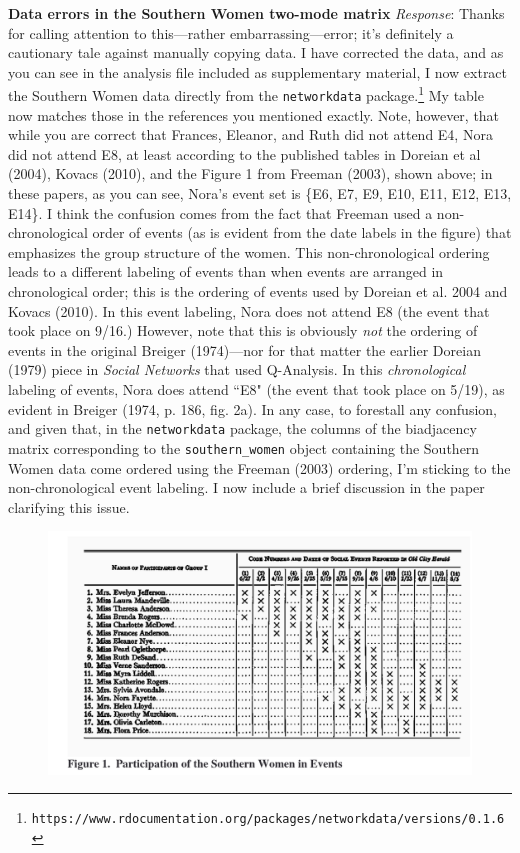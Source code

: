 \documentclass{article}
\begin{document}
\noindent\textbf{Data errors in the Southern Women two-mode matrix}\newline
\textit{Response}: Thanks for calling attention to this---rather embarrassing---error; it's definitely a cautionary tale against manually copying data. I have corrected the data, and as you can see in the analysis file included as supplementary material, I now extract the Southern Women data directly from the \texttt{networkdata} package.\footnote{\texttt{https://www.rdocumentation.org/packages/networkdata/versions/0.1.6}} My table now matches those in the references you mentioned exactly. Note, however, that while you are correct that Frances, Eleanor, and Ruth did not attend E4, Nora did not attend E8, at least according to the published tables in Doreian et al (2004), Kovacs (2010), and the Figure 1 from Freeman (2003), shown above; in these papers, as you can see, Nora's event set is \{E6, E7, E9, E10, E11, E12, E13, E14\}. I think the confusion comes from the fact that Freeman used a non-chronological order of events (as is evident from the date labels in the figure) that emphasizes the group structure of the women. This non-chronological ordering leads to a different labeling of events than when events are arranged in chronological order; this is the ordering of events used by Doreian et al. 2004 and Kovacs (2010). In this event labeling, Nora does not attend E8 (the event that took place on 9/16.) However, note that this is obviously \textit{not} the ordering of events in the original Breiger (1974)---nor for that matter the earlier Doreian (1979) piece in \textit{Social Networks} that used Q-Analysis. In this \textit{chronological} labeling of events, Nora does attend ``E8" (the event that took place on 5/19), as evident in Breiger (1974, p. 186, fig. 2a). In any case, to forestall any confusion, and given that, in the \texttt{networkdata} package, the columns of the biadjacency matrix corresponding to the \texttt{southern\_women} object containing the Southern Women data come ordered using the Freeman (2003) ordering, I'm sticking to the non-chronological event labeling. I now include a brief discussion in the paper clarifying this issue.\newline 


\begin{figure}
    \includegraphics[width=1.0\textwidth]{Reviews and Response/sw-original.png}
\end{figure}
\end{document}
